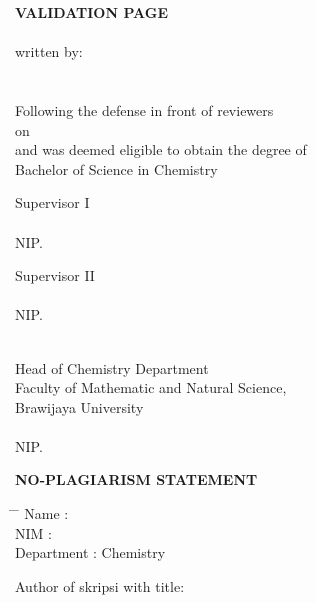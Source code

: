 	\newpage
	
	\begin{center}
	\textrm{\bf VALIDATION PAGE} \\[0.75cm]
	\textbf{\large \@title}\\[0.75cm]
	written by: \\
	\textsc{\@author}\\
	\textsc{\NIM} \\[0.75cm]

Following the defense in front of reviewers \\ 
on \TanggalUjianKomprehensif \\
and was deemed eligible to obtain the degree of \\ Bachelor of Science in Chemistry \\[1.25cm]

	\begin{minipage}{5cm}
		\begin{center}
		Supervisor I\\[1.75cm]
		\NamaPembimbingA \\
		NIP. \NipPembimbingA
		\end{center}
	\end{minipage}
	\begin{minipage}{5cm}
		\begin{center}
		Supervisor II\\[1.75cm]
		\NamaPembimbingB \\
		NIP. \NipPembimbingB
		\end{center}
	\end{minipage}
	\\[1cm]
	
	Head of Chemistry Department \\
	Faculty of Mathematic and Natural Science, \\
	Brawijaya University\\[1.75cm]
	\NamaKajur \\
	NIP.	 \NipKajur
	
	\end{center}
	
	\newpage
	
	\begin{center}
		\textrm{\bf NO-PLAGIARISM STATEMENT}
	\end{center}
	
	\noindent
	\begin{tabbing}
	\hspace{2cm} \= \hspace{0.25cm} \=\kill
	Name \> : \> \@author \\ 
	NIM \> : \> \NIM \\ 
	Department \> : \> Chemistry \\ 
	\end{tabbing} 
	\noindent
	Author of skripsi with title: \\
	\textbf{\@title}\\[0.5cm]
	

